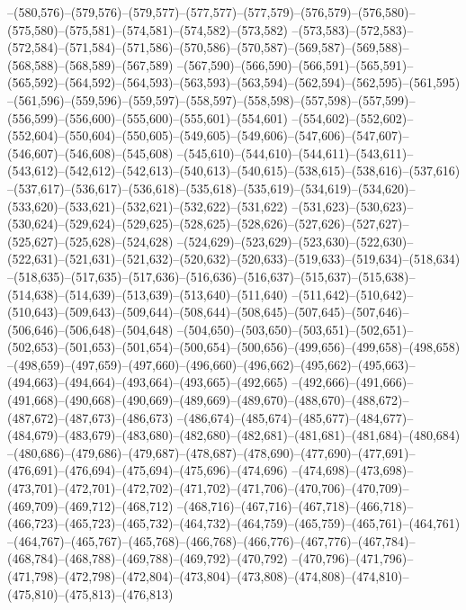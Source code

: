 --(580,576)--(579,576)--(579,577)--(577,577)--(577,579)--(576,579)--(576,580)--(575,580)--(575,581)--(574,581)--(574,582)--(573,582)
--(573,583)--(572,583)--(572,584)--(571,584)--(571,586)--(570,586)--(570,587)--(569,587)--(569,588)--(568,588)--(568,589)--(567,589)
--(567,590)--(566,590)--(566,591)--(565,591)--(565,592)--(564,592)--(564,593)--(563,593)--(563,594)--(562,594)--(562,595)--(561,595)
--(561,596)--(559,596)--(559,597)--(558,597)--(558,598)--(557,598)--(557,599)--(556,599)--(556,600)--(555,600)--(555,601)--(554,601)
--(554,602)--(552,602)--(552,604)--(550,604)--(550,605)--(549,605)--(549,606)--(547,606)--(547,607)--(546,607)--(546,608)--(545,608)
--(545,610)--(544,610)--(544,611)--(543,611)--(543,612)--(542,612)--(542,613)--(540,613)--(540,615)--(538,615)--(538,616)--(537,616)
--(537,617)--(536,617)--(536,618)--(535,618)--(535,619)--(534,619)--(534,620)--(533,620)--(533,621)--(532,621)--(532,622)--(531,622)
--(531,623)--(530,623)--(530,624)--(529,624)--(529,625)--(528,625)--(528,626)--(527,626)--(527,627)--(525,627)--(525,628)--(524,628)
--(524,629)--(523,629)--(523,630)--(522,630)--(522,631)--(521,631)--(521,632)--(520,632)--(520,633)--(519,633)--(519,634)--(518,634)
--(518,635)--(517,635)--(517,636)--(516,636)--(516,637)--(515,637)--(515,638)--(514,638)--(514,639)--(513,639)--(513,640)--(511,640)
--(511,642)--(510,642)--(510,643)--(509,643)--(509,644)--(508,644)--(508,645)--(507,645)--(507,646)--(506,646)--(506,648)--(504,648)
--(504,650)--(503,650)--(503,651)--(502,651)--(502,653)--(501,653)--(501,654)--(500,654)--(500,656)--(499,656)--(499,658)--(498,658)
--(498,659)--(497,659)--(497,660)--(496,660)--(496,662)--(495,662)--(495,663)--(494,663)--(494,664)--(493,664)--(493,665)--(492,665)
--(492,666)--(491,666)--(491,668)--(490,668)--(490,669)--(489,669)--(489,670)--(488,670)--(488,672)--(487,672)--(487,673)--(486,673)
--(486,674)--(485,674)--(485,677)--(484,677)--(484,679)--(483,679)--(483,680)--(482,680)--(482,681)--(481,681)--(481,684)--(480,684)
--(480,686)--(479,686)--(479,687)--(478,687)--(478,690)--(477,690)--(477,691)--(476,691)--(476,694)--(475,694)--(475,696)--(474,696)
--(474,698)--(473,698)--(473,701)--(472,701)--(472,702)--(471,702)--(471,706)--(470,706)--(470,709)--(469,709)--(469,712)--(468,712)
--(468,716)--(467,716)--(467,718)--(466,718)--(466,723)--(465,723)--(465,732)--(464,732)--(464,759)--(465,759)--(465,761)--(464,761)
--(464,767)--(465,767)--(465,768)--(466,768)--(466,776)--(467,776)--(467,784)--(468,784)--(468,788)--(469,788)--(469,792)--(470,792)
--(470,796)--(471,796)--(471,798)--(472,798)--(472,804)--(473,804)--(473,808)--(474,808)--(474,810)--(475,810)--(475,813)--(476,813)

